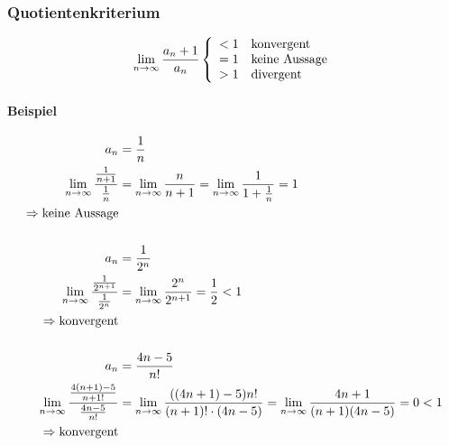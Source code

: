 \subsubsection{Quotientenkriterium}

\[
	\lim_{n \rightarrow{} \infty} \frac{a_n + 1}{a_n}
	\left \{
	\begin{array}{l}
		< 1 \quad \text{konvergent}    \\
		= 1 \quad \text{keine Aussage} \\
		> 1 \quad \text{divergent}
	\end{array}
	\right.
\]

\paragraph{Beispiel}

\begin{align*}
	a_n                                                           & = \frac{1}{n}                                                                                                \\
	\lim_{n \rightarrow{} \infty} \frac{\frac{1}{n + 1}}{\frac{1}{n}}            & = \lim_{n \rightarrow{} \infty} \frac{n}{n+1} = \lim_{n \rightarrow{} \infty} \frac{1}{1 + \frac{1}{n}} = 1                                \\
	\Rightarrow \text{keine Aussage}                                                                                                                                             \\
	\\
	a_n                                                           & = \frac{1}{2^n}                                                                                              \\
	\lim_{n \rightarrow{} \infty} \frac{\frac{1}{2^{n+1}}}{\frac{1}{2^n}}        & = \lim_{n \rightarrow{} \infty} \frac{2^n}{2^{n+1}} = \frac{1}{2} < 1                                                       \\
	\Rightarrow \text{konvergent}                                                                                                                                                \\
	\\
	a_n                                                           & = \frac{4n-5}{n!}                                                                                            \\
	\lim_{n \rightarrow{} \infty} \frac{\frac{4(n+1) -5}{n+1!}}{\frac{4n-5}{n!}} & = \lim_{n \rightarrow{} \infty} \frac{((4n+1) -5) n!}{(n+1)!\cdot (4n-5)} = \lim_{n \rightarrow{} \infty} \frac{4n+1}{(n+1)(4n-5)} = 0 < 1 \\
	\Rightarrow \text{konvergent}
\end{align*}
